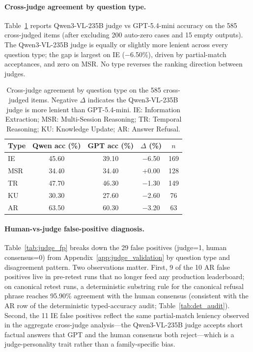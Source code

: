 \documentclass{llmxive}
\begin{document}
\paragraph{Cross-judge agreement by question type.}
Table~\ref{tab:judge_per_type} reports Qwen3-VL-235B judge vs GPT-5.4-mini accuracy on the 585 cross-judged items (after excluding 200 auto-zero cases and 15 empty outputs).
The Qwen3-VL-235B judge is equally or slightly more lenient across every question type; the gap is largest on IE ($-$6.50\%), driven by partial-match acceptances, and zero on MSR.
No type reverses the ranking direction between judges.

\begin{table}[!htbp]
\centering
\small
\begin{tabular}{@{}lcccc@{}}
\toprule
\textbf{Type} & \textbf{Qwen acc (\%)} & \textbf{GPT acc (\%)} & \textbf{$\Delta$ (\%)} & \textbf{$n$} \\
\midrule
IE & 45.60 & 39.10 & $-$6.50 & 169 \\
MSR & 34.40 & 34.40 & $+$0.00 & 128 \\
TR & 47.70 & 46.30 & $-$1.30 & 149 \\
KU & 30.30 & 27.60 & $-$2.60 & 76 \\
AR & 63.50 & 60.30 & $-$3.20 & 63 \\
\bottomrule
\end{tabular}
\caption{Cross-judge agreement by question type on the 585 cross-judged items. Negative $\Delta$ indicates the Qwen3-VL-235B judge is more lenient than GPT-5.4-mini. IE: Information Extraction; MSR: Multi-Session Reasoning; TR: Temporal Reasoning; KU: Knowledge Update; AR: Answer Refusal.}
\label{tab:judge_per_type}
\end{table}

\paragraph{Human-vs-judge false-positive diagnosis.}
Table~\ref{tab:judge_fp} breaks down the 29 false positives (judge=1, human consensus=0) from Appendix~\ref{app:judge_validation} by question type and disagreement pattern.
Two observations matter.
First, 9 of the 10 AR false positives live in pre-retest runs that no longer feed any production leaderboard; on canonical retest runs, a deterministic substring rule for the canonical refusal phrase reaches 95.90\% agreement with the human consensus (consistent with the AR row of the deterministic typed-accuracy audit; Table~\ref{tab:det_audit}).
Second, the 11 IE false positives reflect the same partial-match leniency observed in the aggregate cross-judge analysis---the Qwen3-VL-235B judge accepts short factual answers that GPT and the human consensus both reject---which is a judge-personality trait rather than a family-specific bias.
\end{document}
